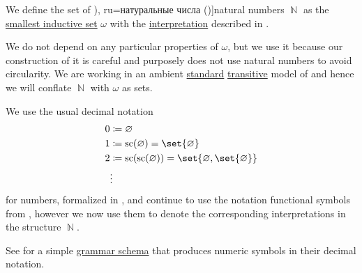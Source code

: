 \begin{definition}\label{def:natural_numbers}
  We define the set of \term[bg=естествени числа (\cite[371]{ГеновМиховскиМоллов1991Алгебра}), ru=натуральные числа (\cite[def. 11.1]{АлександровМаркушевичХинчинИПр1951ЭнциклопедияТом1})]{natural numbers} \( \BbbN \) as the \hyperref[thm:smallest_inductive_set_existence]{smallest inductive set} \( \omega \) with the \hyperref[def:first_order_structure/interpretation]{interpretation} described in .

  We do not depend on any particular properties of \( \omega \), but we use it because our construction of it is careful and purposely does not use natural numbers to avoid circularity. We are working in an ambient \hyperref[rem:standard_model_of_set_theory]{standard} \hyperref[rem:transitive_model_of_set_theory]{transitive} model of \hyperref[def:axiom_of_universes]{} and hence we will conflate \( \BbbN \) with \( \omega \) as sets.

  We use the usual decimal notation
  \begin{align*}
    0 &\coloneqq \varnothing \\
    1 &\coloneqq \op{sc}(\varnothing) = \set{ \varnothing } \\
    2 &\coloneqq \op{sc}(\op{sc}(\varnothing)) = \set{ \varnothing, \set{ \varnothing } } \\
      &\vdots
  \end{align*}
  for numbers, formalized in , and continue to use the notation functional symbols from , however we now use them to denote the corresponding interpretations in the structure \( \BbbN \).
\end{definition}
\begin{comments}
  \item See  for a simple \hyperref[def:formal_grammar/schema]{grammar schema} that produces numeric symbols in their decimal notation.
\end{comments}

